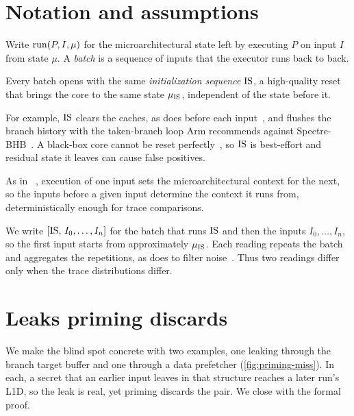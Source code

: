 \section{Notation and assumptions}
\label{sec:priming-notation}

Write $\mathrm{run}(P,I,\mu)$ for the microarchitectural state left by executing $P$ on input $I$ from
state $\mu$. A \emph{batch} is a sequence of inputs that the executor runs back to back.

\begin{assumption}
\label{asm:is}
Every batch opens with the same \emph{initialization sequence} $\mathrm{IS}$, a high-quality reset that
brings the core to the same state $\mu_{\mathrm{IS}}$, independent of the state before it.
\end{assumption}

\noindent For example, $\mathrm{IS}$ clears the caches, as \revizor{} does before each
input~\cite{hide_seek}, and flushes the branch history with the taken-branch loop Arm recommends
against Spectre-BHB~\cite{arm_spectre_bhb}. A black-box core cannot be reset
perfectly~\cite{hide_seek}, so $\mathrm{IS}$ is best-effort and residual state it leaves can cause false
positives.

\begin{assumption}
\label{asm:prime}
As in \revizor{}~\cite{revizor}, execution of one input sets the microarchitectural context for
the next, so the inputs before a given input determine the context it runs from, deterministically
enough for trace comparisons.
\end{assumption}

We write $[\mathrm{IS},\,I_0,\dots,I_n]$ for the batch that runs $\mathrm{IS}$ and then the inputs
$I_0,\dots,I_n$, so the first input starts from approximately $\mu_{\mathrm{IS}}$. Each reading repeats the
batch and aggregates the repetitions, as \revizor{} does to filter noise~\cite{revizor}. Thus two
readings differ only when the trace distributions differ.

\section{Leaks priming discards}
\label{sec:priming-gap}

We make the blind spot concrete with two examples, one leaking through the branch target buffer and
one through a data prefetcher (\autoref{fig:priming-miss}). In each, a secret that an earlier input
leaves in that structure reaches a later run's L1D, so the leak is real, yet priming discards the
pair. We close with the formal proof.

